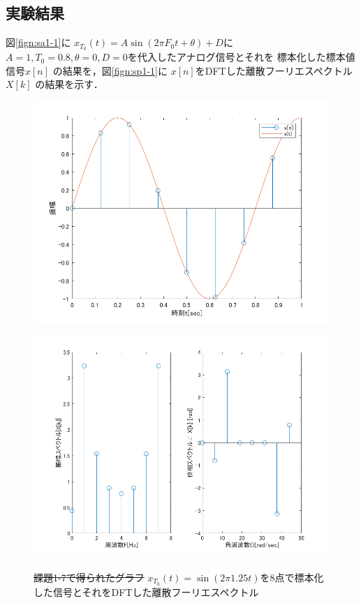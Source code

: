 \documentclass[11pt, a4paper, titlepage]{ltjsarticle}
\begin{document}
\subsection*{実験結果}
図\ref*{fign:sa1-1}に
$x_{T_{0}}(t)=A\sin(2\pi F_{0}t+\theta)+ D$に
$A=1,T_{0}=0.8,\theta=0,D=0$を代入したアナログ信号とそれを
標本化した標本値信号$x[n]$
の結果を，図\ref*{fign:sp1-1}に
$x[n]$をDFTした離散フーリエスペクトル$X[k]$
の結果を示す．
\begin{figure}[h]
\begin{center}
\begin{minipage}[t]{0.48\columnwidth}
    \includegraphics[width=\columnwidth]{figures/sampling1-7.png}
    \label{fign:sa1-7}
\end{minipage}
\begin{minipage}[t]{0.48\columnwidth}
    \includegraphics[width=\columnwidth]{figures/spectrum1-7.png}
    \label{fign:sp1-7}
\end{minipage}
\end{center}
\caption{\sout{課題1-7で得られたグラフ}
$x_{T_{0}}(t)=\sin(2\pi 1.25t)$を8点で標本化した信号とそれをDFTした離散フーリエスペクトル}
\end{figure}
\end{document}
